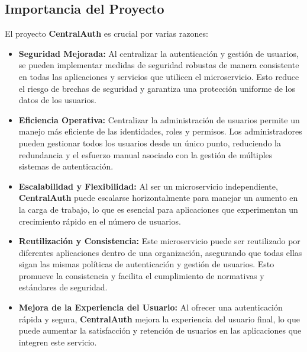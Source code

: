 \subsection{Importancia del Proyecto}

El proyecto \textbf{CentralAuth} es crucial por varias razones:

\begin{itemize}
    \item \textbf{Seguridad Mejorada:} Al centralizar la autenticación y gestión de usuarios, se pueden implementar medidas de seguridad robustas de manera consistente en todas las aplicaciones y servicios que utilicen el microservicio. Esto reduce el riesgo de brechas de seguridad y garantiza una protección uniforme de los datos de los usuarios.
    \item \textbf{Eficiencia Operativa:} Centralizar la administración de usuarios permite un manejo más eficiente de las identidades, roles y permisos. Los administradores pueden gestionar todos los usuarios desde un único punto, reduciendo la redundancia y el esfuerzo manual asociado con la gestión de múltiples sistemas de autenticación.
    \item \textbf{Escalabilidad y Flexibilidad:} Al ser un microservicio independiente, \textbf{CentralAuth} puede escalarse horizontalmente para manejar un aumento en la carga de trabajo, lo que es esencial para aplicaciones que experimentan un crecimiento rápido en el número de usuarios.
    \item \textbf{Reutilización y Consistencia:} Este microservicio puede ser reutilizado por diferentes aplicaciones dentro de una organización, asegurando que todas ellas sigan las mismas políticas de autenticación y gestión de usuarios. Esto promueve la consistencia y facilita el cumplimiento de normativas y estándares de seguridad.
    \item \textbf{Mejora de la Experiencia del Usuario:} Al ofrecer una autenticación rápida y segura, \textbf{CentralAuth} mejora la experiencia del usuario final, lo que puede aumentar la satisfacción y retención de usuarios en las aplicaciones que integren este servicio.
\end{itemize}